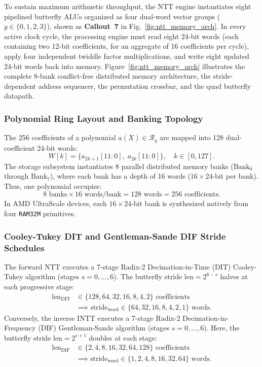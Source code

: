 To sustain maximum arithmetic throughput, the NTT engine instantiates eight pipelined butterfly ALUs organized as four dual-word vector groups ($g \in \{0, 1, 2, 3\}$), shown as \textbf{Callout~7} in Fig.~\ref{fig:ntt_memory_arch}. In every active clock cycle, the processing engine must read eight 24-bit words (each containing two 12-bit coefficients, for an aggregate of 16 coefficients per cycle), apply four independent twiddle factor multiplications, and write eight updated 24-bit words back into memory. Figure~\ref{fig:ntt_memory_arch} illustrates the complete 8-bank conflict-free distributed memory architecture, the stride-dependent address sequencer, the permutation crossbar, and the quad butterfly datapath.

\subsubsection{Polynomial Ring Layout and Banking Topology}
The 256 coefficients of a polynomial $a(X) \in \mathcal{R}_q$ are mapped into 128 dual-coefficient 24-bit words:
\begin{equation}
\label{eq:ntt_word_format}
W[k] = \{a_{2k+1}[11:0], \; a_{2k}[11:0]\}, \quad k \in [0, 127].
\end{equation}
The storage subsystem instantiates 8 parallel distributed memory banks ($\text{Bank}_0$ through $\text{Bank}_7$), where each bank has a depth of 16 words ($16 \times 24\text{-bit}$ per bank). Thus, one polynomial occupies:
\begin{equation}
\label{eq:poly_bank_capacity}
8 \text{ banks} \times 16 \text{ words/bank} = 128 \text{ words} = 256 \text{ coefficients}.
\end{equation}
In AMD UltraScale devices, each $16 \times 24\text{-bit}$ bank is synthesized natively from four \texttt{RAM32M} primitives.

\subsubsection{Cooley-Tukey DIT and Gentleman-Sande DIF Stride Schedules}
The forward NTT executes a 7-stage Radix-2 Decimation-in-Time (DIT) Cooley-Tukey algorithm (stages $s = 0, \dots, 6$). The butterfly stride $\text{len} = 2^{6-s}$ halves at each progressive stage:
\begin{align}
\label{eq:dit_strides}
\text{len}_{\text{DIT}} &\in \{128, 64, 32, 16, 8, 4, 2\} \text{ coefficients} \nonumber \\
&\implies \text{stride}_{\text{word}} \in \{64, 32, 16, 8, 4, 2, 1\} \text{ words}.
\end{align}
Conversely, the inverse INTT executes a 7-stage Radix-2 Decimation-in-Frequency (DIF) Gentleman-Sande algorithm (stages $s = 0, \dots, 6$). Here, the butterfly stride $\text{len} = 2^{s+1}$ doubles at each stage:
\begin{align}
\label{eq:dif_strides}
\text{len}_{\text{DIF}} &\in \{2, 4, 8, 16, 32, 64, 128\} \text{ coefficients} \nonumber \\
&\implies \text{stride}_{\text{word}} \in \{1, 2, 4, 8, 16, 32, 64\} \text{ words}.
\end{align}

